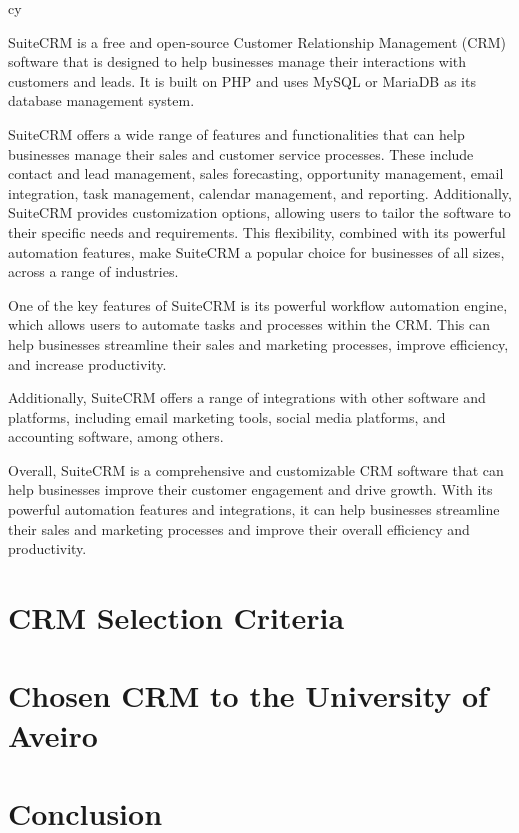 cy\documentclass{article}
\begin{document}
SuiteCRM is a free and open-source Customer Relationship Management (CRM) software that is designed to help businesses manage their interactions with customers and leads. It is built on PHP and uses MySQL or MariaDB as its database management system.

SuiteCRM offers a wide range of features and functionalities that can help businesses manage their sales and customer service processes. These include contact and lead management, sales forecasting, opportunity management, email integration, task management, calendar management, and reporting. Additionally, SuiteCRM provides customization options, allowing users to tailor the software to their specific needs and requirements. This flexibility, combined with its powerful automation features, make SuiteCRM a popular choice for businesses of all sizes, across a range of industries.

One of the key features of SuiteCRM is its powerful workflow automation engine, which allows users to automate tasks and processes within the CRM. This can help businesses streamline their sales and marketing processes, improve efficiency, and increase productivity.

Additionally, SuiteCRM offers a range of integrations with other software and platforms, including email marketing tools, social media platforms, and accounting software, among others. 

Overall, SuiteCRM is a comprehensive and customizable CRM software that can help businesses improve their customer engagement and drive growth. With its powerful automation features and integrations, it can help businesses streamline their sales and marketing processes and improve their overall efficiency and productivity.


\section{CRM Selection Criteria}

\section{Chosen CRM to the University of Aveiro}




\section{Conclusion}


\nocite{*}
\printbibliography
\end{document}
